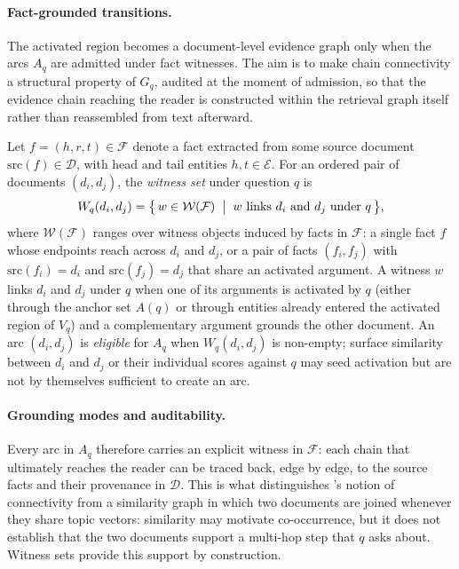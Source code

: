 \paragraph{Fact-grounded transitions.}
\label{sec:method:transition}
The activated region becomes a document-level evidence graph only when the
arcs $A_q$ are admitted under fact witnesses. The aim is to make chain
connectivity a structural property of $G_q$, audited at the moment of
admission, so that the evidence chain reaching the reader is constructed
within the retrieval graph itself rather than reassembled from text
afterward.

Let $f = (h, r, t) \in \mathcal{F}$ denote a fact extracted from some
source document $\mathrm{src}(f) \in \mathcal{D}$, with head and tail
entities $h, t \in \mathcal{E}$. For an ordered pair of documents
$(d_i, d_j)$, the \emph{witness set} under question $q$ is
\begin{equation}
\label{eq:witness-set}
W_q(d_i, d_j) = \bigl\{\, w \in \mathcal{W}(\mathcal{F}) \;\bigm|\;
w \text{ links } d_i \text{ and } d_j \text{ under } q \,\bigr\},
\end{equation}
where $\mathcal{W}(\mathcal{F})$ ranges over witness objects induced by
facts in $\mathcal{F}$: a single fact $f$ whose endpoints reach across
$d_i$ and $d_j$, or a pair of facts $(f_i, f_j)$ with
$\mathrm{src}(f_i) = d_i$ and $\mathrm{src}(f_j) = d_j$ that share an
activated argument. A witness $w$ links $d_i$ and $d_j$ under $q$ when one
of its arguments is activated by $q$ (either through the anchor set
$A(q)$ or through entities already entered the activated region of $V_q$)
and a complementary argument grounds the other document. An arc
$(d_i, d_j)$ is \emph{eligible} for $A_q$ when $W_q(d_i, d_j)$ is
non-empty; surface similarity between $d_i$ and $d_j$ or their individual
scores against $q$ may seed activation but are not by themselves
sufficient to create an arc.

\paragraph{Grounding modes and auditability.}
Every arc in $A_q$ therefore carries an explicit witness in $\mathcal{F}$:
each chain that ultimately reaches the reader can be traced back, edge by
edge, to the source facts and their provenance in $\mathcal{D}$. This is
what distinguishes \methodname{}'s notion of connectivity from a
similarity graph in which two documents are joined whenever they share
topic vectors: similarity may motivate co-occurrence, but it does not
establish that the two documents support a multi-hop step that $q$ asks
about. Witness sets provide this support by construction.

